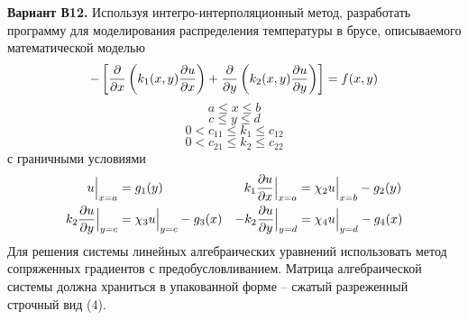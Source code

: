 \textbf{Вариант В12.} Используя интегро-интерполяционный метод,
разработать программу для моделирования распределения температуры
в брусе, описываемого математической моделью
\begin{equation}\label{main-equation}
  - \left[
    \pdv{x} \left( k_1(x, y) \pdv{u}{x} \right) +
    \pdv{y} \left( k_2(x, y) \pdv{u}{y} \right)
  \right] = f(x, y)
\end{equation}
\[ a \leq x \leq b \]
\[ c \leq y \leq d \]
\[ 0 < c_{11} \leq k_1 \leq c_{12} \]
\[ 0 < c_{21} \leq k_2 \leq c_{22} \]
с граничными условиями
\begin{align*}
  u \Big\vert_{x = a} &= g_1(y)
  &
  k_1 \pdv{u}{x}\Big\vert_{x = a} &= \chi_2 u \Big\vert_{x = b} - g_2(y) \\
  k_2 \pdv{u}{y}\Big\vert_{y = c} &= \chi_3 u \Big\vert_{y = c} - g_3(x)
  &
  - k_2 \pdv{u}{y}\Big\vert_{y = d} &= \chi_4 u \Big\vert_{y = d} - g_4(x)
\end{align*}
Для решения системы линейных алгебраических уравнений использовать
метод сопряженных градиентов с предобусловливанием. Матрица
алгебраической системы должна храниться в упакованной форме -- сжатый
разреженный строчный вид (4).
